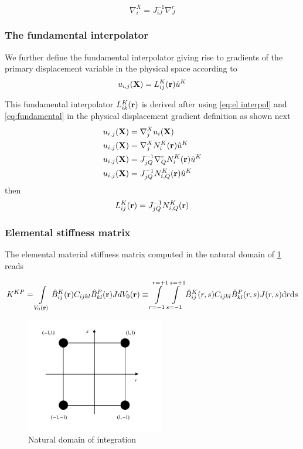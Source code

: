 \begin{equation}
\nabla_i^X=J_{iJ}^{-1}\nabla_J^r
\label{eq:fundamental}
\end{equation}


\subsubsection*{The fundamental interpolator}
We further define the fundamental interpolator giving rise to gradients of the primary displacement variable in the physical space according to
\begin{equation}
u_{i,j}(\vb{X})=L_{ij}^K(\vb{r})\hat{u}^K
\label{eq:fund operator}
\end{equation}


This fundamental interpolator  $L_{ik}^K(\vb{r})$ is derived after using \cref{eq:el interpol} and \cref{eq:fundamental} in the physical displacement gradient definition as shown next
\begin{align*}
u_{i,j}(\vb{X})&=\nabla_j^X u_i(\vb{X})\\
u_{i,j}(\vb{X})&=\nabla_j^X N_i^K(\vb{r})\hat{u}^K\\
u_{i,j}(\vb{X})&=J_{jQ}^{-1}\nabla_Q^r N_i^K(\vb{r})\hat{u}^K\\
u_{i,j}(\vb{X})&=J_{jQ}^{-1}N_{i,Q}^K(\vb{r})\hat{u}^K
\end{align*}
then
\begin{equation}
L_{ij}^K(\vb{r})=J_{jQ}^{-1}N_{i,Q}^K(\vb{r})
\label{eq:fundamental interpolator}
\end{equation}

\subsubsection*{Elemental stiffness matrix}
The elemental material stiffness matrix computed in the natural domain of \cref{fig:Nat domain} reads

\begin{equation}
K^{KP}=\int\limits_{V_0(\vb{r})} \hat{B}_{ij}^K(\vb{r}) C_{ijkl} \hat{B}_{kl}^P(\vb{r})J dV_0(\vb{r})\equiv \int\limits_{r=-1}^{r=+1}\int\limits_{s=-1}^{s=+1} \hat{B}_{ij}^K(r,s) C_{ijkl} \hat{B}_{kl}^P(r,s)J(r,s) \mathrm{d}r\mathrm{d}s
\label{eq:elematrix}
\end{equation}



\begin{figure}[h]
\centering
\includegraphics[width=6cm]{figure3.pdf}
\caption{Natural domain of integration}
\label{fig:Nat domain}
\end{figure}
 

